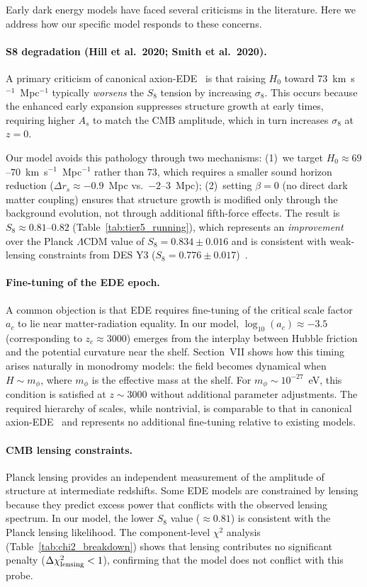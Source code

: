 \documentclass[a4paper,11pt]{article}
\begin{document}
Early dark energy models have faced several criticisms in the literature. Here we address how our specific model responds to these concerns.

\paragraph{S8 degradation (Hill et al.\ 2020; Smith et al.\ 2020).}
A primary criticism of canonical axion-EDE~\cite{Hill2020,Smith2020} is that raising $H_0$ toward $73$~km~s$^{-1}$~Mpc$^{-1}$ typically \emph{worsens} the $S_8$ tension by increasing $\sigma_8$. This occurs because the enhanced early expansion suppresses structure growth at early times, requiring higher $A_s$ to match the CMB amplitude, which in turn increases $\sigma_8$ at $z=0$.

Our model avoids this pathology through two mechanisms: (1)~we target $H_0 \approx 69$--$70$~km~s$^{-1}$~Mpc$^{-1}$ rather than $73$, which requires a smaller sound horizon reduction ($\Delta r_s \approx -0.9$~Mpc vs.\ $-2$--$3$~Mpc); (2)~setting $\beta = 0$ (no direct dark matter coupling) ensures that structure growth is modified only through the background evolution, not through additional fifth-force effects. The result is $S_8 \approx 0.81$--$0.82$ (Table~\ref{tab:tier5_running}), which represents an \emph{improvement} over the Planck $\Lambda$CDM value of $S_8 = 0.834 \pm 0.016$ and is consistent with weak-lensing constraints from DES Y3 ($S_8 = 0.776 \pm 0.017$)~\cite{DES_Y3}.

\paragraph{Fine-tuning of the EDE epoch.}
A common objection is that EDE requires fine-tuning of the critical scale factor $a_c$ to lie near matter-radiation equality. In our model, $\log_{10}(a_c) \approx -3.5$ (corresponding to $z_c \approx 3000$) emerges from the interplay between Hubble friction and the potential curvature near the shelf. Section~VII shows how this timing arises naturally in monodromy models: the field becomes dynamical when $H \sim m_\phi$, where $m_\phi$ is the effective mass at the shelf. For $m_\phi \sim 10^{-27}$~eV, this condition is satisfied at $z \sim 3000$ without additional parameter adjustments. The required hierarchy of scales, while nontrivial, is comparable to that in canonical axion-EDE~\cite{Poulin_EDE} and represents no additional fine-tuning relative to existing models.

\paragraph{CMB lensing constraints.}
Planck lensing provides an independent measurement of the amplitude of structure at intermediate redshifts. Some EDE models are constrained by lensing because they predict excess power that conflicts with the observed lensing spectrum. In our model, the lower $S_8$ value ($\approx 0.81$) is consistent with the Planck lensing likelihood. The component-level $\chi^2$ analysis (Table~\ref{tab:chi2_breakdown}) shows that lensing contributes no significant penalty ($\Delta\chi^2_{\rm lensing} < 1$), confirming that the model does not conflict with this probe.
\end{document}
